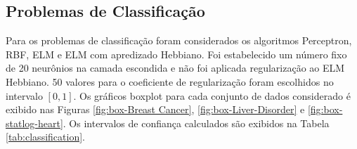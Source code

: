 \documentclass[conference]{IEEEtran}
\begin{document}
	\subsection{Problemas de Classificação}
	Para os problemas de classificação foram considerados os algoritmos Perceptron, RBF, ELM e ELM com apredizado Hebbiano. Foi estabelecido um número fixo de 20 neurônios na camada escondida e não foi aplicada regularização ao ELM Hebbiano. 50 valores para o coeficiente de regularização foram escolhidos no intervalo $[0,1]$. Os gráficos boxplot para cada conjunto de dados considerado é exibido nas Figuras \ref{fig:box-Breast Cancer}, \ref{fig:box-Liver-Disorder} e \ref{fig:box-statlog-heart}. Os intervalos de confiança calculados são exibidos na Tabela \ref{tab:classification}.
%	
%	
%	
%	
	
\end{document}
